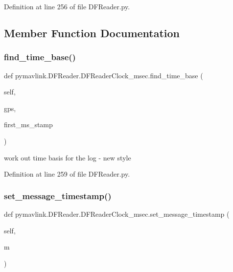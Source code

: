 Definition at line 256 of file D\+F\+Reader.\+py.



\subsection{Member Function Documentation}
\mbox{\label{classpymavlink_1_1DFReader_1_1DFReaderClock__msec_a175357de9e67b92d2977d9aab2a3fe1a}} 
\subsubsection{\texorpdfstring{find\_time\_base()}{find\_time\_base()}}
{\footnotesize\ttfamily def pymavlink.\+D\+F\+Reader.\+D\+F\+Reader\+Clock\+\_\+msec.\+find\+\_\+time\+\_\+base (\begin{DoxyParamCaption}\item[{}]{self,  }\item[{}]{gps,  }\item[{}]{first\+\_\+ms\+\_\+stamp }\end{DoxyParamCaption})}

\begin{DoxyVerb}work out time basis for the log - new style\end{DoxyVerb}
 

Definition at line 259 of file D\+F\+Reader.\+py.

\mbox{\label{classpymavlink_1_1DFReader_1_1DFReaderClock__msec_a66a8cb335b6ff41e1390e9a8e9bf292a}} 
\subsubsection{\texorpdfstring{set\_message\_timestamp()}{set\_message\_timestamp()}}
{\footnotesize\ttfamily def pymavlink.\+D\+F\+Reader.\+D\+F\+Reader\+Clock\+\_\+msec.\+set\+\_\+message\+\_\+timestamp (\begin{DoxyParamCaption}\item[{}]{self,  }\item[{}]{m }\end{DoxyParamCaption})}



